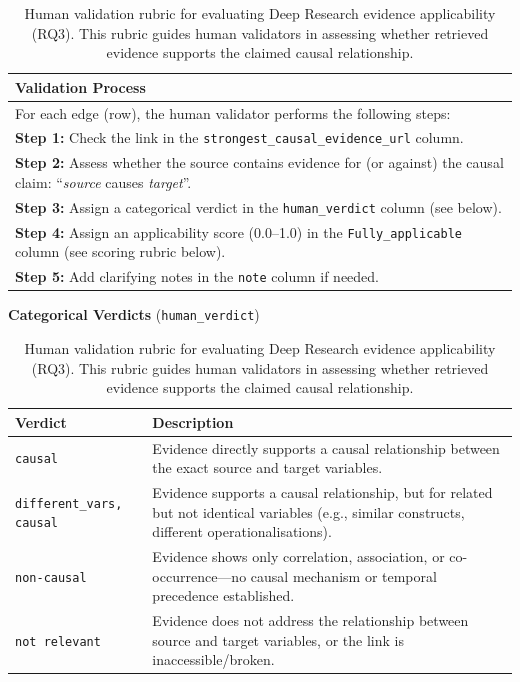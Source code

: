 \begin{table}[H]
\centering
\caption[Human validation rubric for RQ3]{Human validation rubric for evaluating Deep Research evidence applicability (RQ3). This rubric guides human validators in assessing whether retrieved evidence supports the claimed causal relationship.}
\label{tab:human-validation-rubric-rq3}
\small

\begin{tabular}{p{}}
\toprule
\textbf{Validation Process} \\
\midrule
For each edge (row), the human validator performs the following steps: \\[0.5em]

\textbf{Step 1:} Check the link in the \texttt{strongest\_causal\_evidence\_url} column. \\[0.3em]

\textbf{Step 2:} Assess whether the source contains evidence for (or against) the causal claim: ``\textit{source} causes \textit{target}''. \\[0.3em]

\textbf{Step 3:} Assign a categorical verdict in the \texttt{human\_verdict} column (see below). \\[0.3em]

\textbf{Step 4:} Assign an applicability score (0.0--1.0) in the \texttt{Fully\_applicable} column (see scoring rubric below). \\[0.3em]

\textbf{Step 5:} Add clarifying notes in the \texttt{note} column if needed. \\
\bottomrule
\end{tabular}

\vspace{1em}

\textbf{Categorical Verdicts} (\texttt{human\_verdict})

\vspace{0.5em}

\begin{tabular}{|p{3.8cm}|p{9.5cm}|}
\hline
\textbf{Verdict} & \textbf{Description} \\
\hline
\texttt{causal} & Evidence directly supports a causal relationship between the exact source and target variables. \\
\hline
\texttt{different\_vars, causal} & Evidence supports a causal relationship, but for related but not identical variables (e.g., similar constructs, different operationalisations). \\
\hline
\texttt{non-causal} & Evidence shows only correlation, association, or co-occurrence---no causal mechanism or temporal precedence established. \\
\hline
\texttt{not relevant} & Evidence does not address the relationship between source and target variables, or the link is inaccessible/broken. \\
\hline
\end{tabular}


\end{table}

